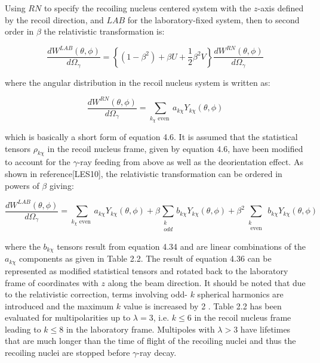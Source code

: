 \documentclass[10pt]{article}
\begin{document}
Using $R N$ to specify the recoiling nucleus centered system with the $z$-axis defined by the recoil direction, and $L A B$ for the laboratory-fixed system, then to second order in $\beta$ the relativistic transformation is:


\begin{equation*}
\frac{d W^{L A B}(\theta, \phi)}{d \Omega_{\gamma}}=\left\{\left(1-\beta^{2}\right)+\beta U+\frac{1}{2} \beta^{2} V\right\} \frac{d W^{R N}(\theta, \phi)}{d \Omega_{\gamma}} \tag{4.34}
\end{equation*}


where the angular distribution in the recoil nucleus system is written as:


\begin{equation*}
\frac{d W^{R N}(\theta, \phi)}{d \Omega_{\gamma}}=\sum_{k_{\chi} \text { even }} a_{k \chi} Y_{k \chi}(\theta, \phi) \tag{4.35}
\end{equation*}


which is basically a short form of equation 4.6. It is assumed that the statistical tensors $\rho_{k \chi}$ in the recoil nucleus frame, given by equation 4.6, have been modified to account for the $\gamma$-ray feeding from above as well as the deorientation effect. As shown in reference[LES10], the relativistic transformation can be ordered in powers of $\beta$ giving:


\begin{equation*}
\frac{d W^{L A B}(\theta, \phi)}{d \Omega_{\gamma}}=\sum_{k_{\chi} \text { even }} a_{k \chi} Y_{k \chi}(\theta, \phi)+\beta \sum_{\substack{k \\ o d d}} b_{k \chi} Y_{k \chi}(\theta, \phi)+\beta^{2} \sum_{\substack{k \\ \text { even }}} b_{k \chi} Y_{k \chi}(\theta, \phi) \tag{4.36}
\end{equation*}


where the $b_{k \chi}$ tensors result from equation 4.34 and are linear combinations of the $a_{k \chi}$ components as given in Table 2.2. The result of equation 4.36 can be represented as modified statistical tensors and rotated back to the laboratory frame of coordinates with $z$ along the beam direction. It should be noted that due to the relativistic correction, terms involving odd- $k$ spherical harmonics are introduced and the maximum $k$ value is increased by 2 . Table 2.2 has been evaluated for multipolarities up to $\lambda=3$, i.e. $k \leq 6$ in the recoil nucleus frame leading to $k \leq 8$ in the laboratory frame. Multipoles with $\lambda>3$ have lifetimes that are much longer than the time of flight of the recoiling nuclei and thus the recoiling nuclei are stopped before $\gamma$-ray decay.
\end{document}
